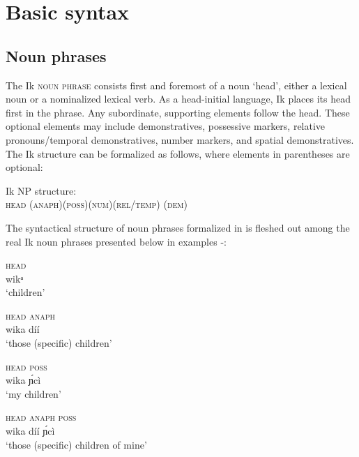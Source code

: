 \section{Basic syntax}\label{sec:10}



\subsection{Noun phrases}\label{sec:10.1}


The Ik \textsc{noun phrase} consists first and foremost of a noun ‘head’, either a lexical noun or a nominalized lexical verb. As a head-initial language, Ik places its  head first in the phrase. Any subordinate, supporting elements follow the head. These optional elements may include  demonstratives, possessive markers, relative pronouns/temporal demonstratives, number markers, and spatial demonstratives. The Ik  structure can be formalized as follows, where elements in parentheses are optional:


\newpage 
\ea\label{ex:syn:1}
Ik NP structure: \\
\textsc{head (anaph)(poss)(num)(rel/temp) (dem)}
\z


The syntactical structure of noun phrases formalized in  is fleshed out among the real Ik noun phrases presented below in examples -:




\ea\label{ex:syn:2}
\gll \textsc{head} \\
 wikᵃ    \\
\glt ‘children’ 
\z





\ea\label{ex:syn:3}
\gll \textsc{head} \textsc{anaph} \\
wika díí    \\
\glt ‘those (specific) children’ 
\z





\ea\label{ex:syn:4}
\gll \textsc{head} \textsc{poss} \\
wika \'{ɲ}cì    \\
\glt ‘my children’ 
\z





\ea\label{ex:syn:5}
\gll \textsc{head} \textsc{anaph} \textsc{poss} \\
wika díí \'{ɲ}cì    \\
\glt ‘those (specific) children of mine’ 
\z






